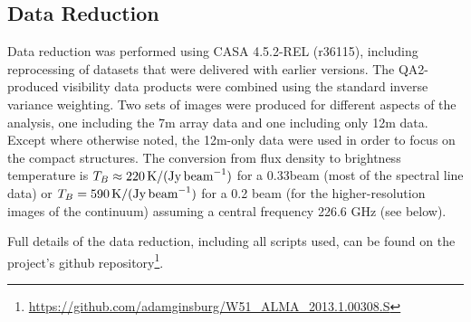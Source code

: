 \documentclass{emulateapj}
\begin{document}




\subsection{Data Reduction}
Data reduction was performed using CASA 4.5.2-REL (r36115), including
reprocessing of datasets that were delivered with earlier versions.  The
QA2-produced visibility data products were combined using the standard inverse
variance weighting.  Two sets of images were produced for different aspects of
the analysis, one including the 7m array data and one including only 12m data.
Except where otherwise noted, the 12m-only data were used in order to focus on
the compact structures.  The conversion from
flux density to brightness temperature is $T_B \approx 220
\mathrm{\,K}/(\mathrm{Jy}\,\textrm{beam}^{-1})$ for a 0.33\arcsec beam (most of the spectral
line data) or $T_B=590\mathrm{\,K}/(\mathrm{Jy}\,\textrm{beam}^{-1})$ for a 0.2\arcsec
beam (for the higher-resolution images of the continuum) assuming a central
frequency 226.6 GHz (see below).

Full details of the data reduction, including all scripts used, can be found on
the project's github
repository\footnote{\url{https://github.com/adamginsburg/W51_ALMA_2013.1.00308.S}}.
\end{document}
